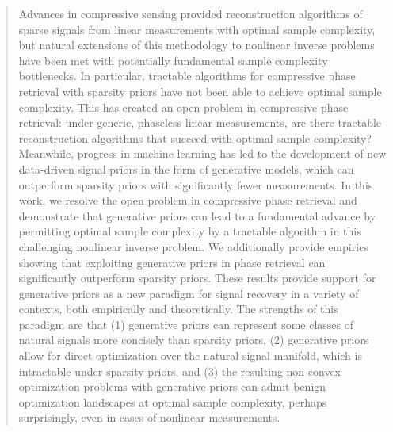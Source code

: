 \documentclass[11pt]{article}
\theoremstyle{remark}
\begin{document}
\begin{abstract}
 
Advances in compressive sensing provided reconstruction algorithms of sparse signals from linear measurements with optimal sample complexity, but natural extensions of this methodology to nonlinear inverse problems have been met with potentially fundamental sample complexity bottlenecks. In particular, tractable algorithms for compressive phase retrieval with sparsity priors have not been able to achieve optimal sample complexity.  This has created an open problem in compressive phase retrieval: under generic, phaseless linear measurements, are there tractable reconstruction algorithms that succeed with optimal sample complexity? Meanwhile, progress in machine learning has led to the development of new data-driven signal priors in the form of generative models, which can outperform sparsity priors with significantly fewer measurements.   %
 In this work, we resolve the open problem in compressive phase retrieval and demonstrate that generative priors can lead to a fundamental advance by permitting optimal sample complexity by a tractable algorithm in this challenging nonlinear inverse problem. We additionally provide empirics showing that exploiting generative priors in phase retrieval can significantly outperform sparsity priors. 
 These results provide support for generative priors as a new paradigm for signal recovery in a variety of contexts, both empirically and theoretically.  The strengths of this paradigm are that (1) generative priors can represent some classes of natural signals more concisely than sparsity priors, (2) generative priors allow for direct optimization over the natural signal manifold, which is intractable under sparsity priors, and (3) the resulting non-convex optimization problems with generative priors can admit benign optimization landscapes at optimal sample complexity, perhaps surprisingly, even in cases of nonlinear measurements.
 

\end{abstract}
\end{document}
